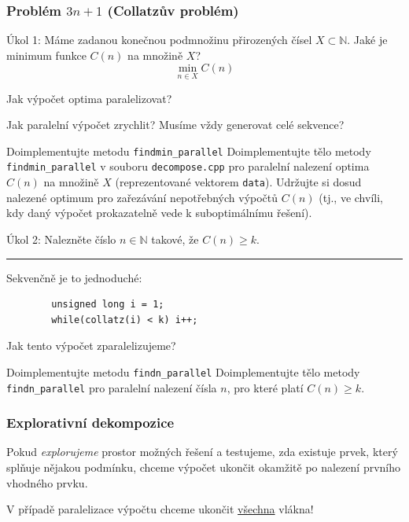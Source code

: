 \documentclass[usenames,dvipsnames,9pt]{beamer}
\begin{document}
{
\begin{frame}[fragile]
	\frametitle{Problém $3n+1$ (Collatzův problém)}
	Úkol 1: Máme zadanou konečnou podmnožinu přirozených čísel $X \subset \mathbb{N}$. Jaké je minimum funkce $C(n)$ na množině $X$?
	\[ \min_{n \in X} C(n) \]
	\pause
  \begin{center}
    \Large Jak výpočet optima paralelizovat?
  \end{center}
  \pause
  \begin{center}
    {\Large Jak paralelní výpočet zrychlit?}
    Musíme vždy generovat celé sekvence?
  \end{center}

  \pause
  \begin{block}{Doimplementujte metodu \texttt{findmin\_parallel}}
    Doimplementujte tělo metody \texttt{findmin\_parallel} v souboru \texttt{decompose.cpp} pro paralelní nalezení optima $C(n)$ na množině $X$ (reprezentované vektorem \texttt{data}).
    Udržujte si dosud nalezené optimum pro zařezávání nepotřebných výpočtů $C(n)$ (tj., ve chvíli, kdy daný výpočet prokazatelně vede k suboptimálnímu řešení).
  \end{block}
\end{frame}

\begin{frame}[fragile]
	Úkol 2: Nalezněte číslo $n \in \mathbb{N}$ takové, že $C(n) \geq k$.

	\pause
	\vspace{1em}\hrule\vspace{1em}
	Sekvenčně je to jednoduché:
	\begin{verbatim}
		unsigned long i = 1;
		while(collatz(i) < k) i++;
	\end{verbatim}
	\begin{center}
		\Large Jak tento výpočet zparalelizujeme?
	\end{center}

	\pause
	\begin{block}{Doimplementujte metodu \texttt{findn\_parallel}}
		Doimplementujte tělo metody \texttt{findn\_parallel} pro paralelní nalezení čísla $n$, pro které platí $C(n) \geq k$.
	\end{block}
\end{frame}
}

\begin{frame}
	\frametitle{Explorativní dekompozice}
	\faWarning \hspace{3pt}
	Pokud \emph{explorujeme} prostor možných řešení a testujeme, zda existuje prvek, který splňuje nějakou podmínku, chceme výpočet ukončit okamžitě po nalezení prvního vhodného prvku.

	\pause
	\vspace{0.5em}
	\hfill V případě paralelizace výpočtu chceme ukončit \underline{všechna} vlákna!
\end{frame}
\end{document}
